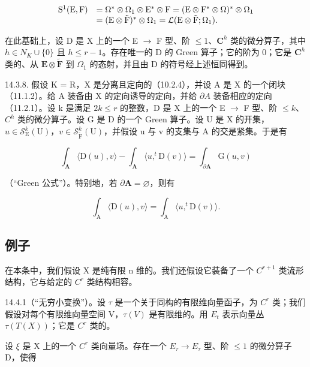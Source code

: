 \[
\begin{array}{r l} \mathrm{S} ^ {1} (\mathrm{E}, \mathrm{F}) & = \Omega^ {*} \otimes \Omega_ {1} \otimes \mathrm{E} ^ {*} \otimes \mathrm{F} = (\mathrm{E} \otimes \mathrm{F} ^ {*} \otimes \Omega) ^ {*} \otimes \Omega_ {1} \\ & = (\mathrm{E} \otimes \tilde {\mathrm{F}}) ^ {*} \otimes \Omega_ {1} = \mathcal {L} (\mathrm{E} \otimes \tilde {\mathrm{F}}; \Omega_ {1}). \end{array}
\]

在此基础上，设 D 是 X 上的一个 E \(\to\) F 型、阶 \(\leqslant1\)、\(\mathbf{C}^{h}\) 类的微分算子，其中 \(h \in N_{K} \cup \{0\}\) 且 \(h \leqslant r-1\)。存在唯一的 D 的 Green 算子；它的阶为 0；它是 \(\mathbf{C}^{h}\) 类的、从 \(\mathbf{E}\otimes\widetilde{\mathbf{F}}\) 到 \(\Omega_{1}\) 的态射，并且由 D 的符号经上述恒同得到。

14.3.8. 假设 K = R，X 是分离且定向的（10.2.4），并设 A 是 X 的一个闭块（11.1.2）。给 A 装备由 X 的定向诱导的定向，并给 \(\partial A\) 装备相应的定向（11.2.1）。设 k 是满足 \(2k \leqslant r\) 的整数，D 是 X 上的一个 E \(\to\) F 型、阶 \(\leqslant k\)、\(C^{h}\) 类的微分算子。设 G 是 D 的一个 Green 算子。设 U 是 X 的开集，\(u \in \mathcal{S}_{\mathrm{E}}^{k}(\mathrm{U})\)，\(v \in \mathcal{S}_{\widetilde{\mathrm{F}}}^{k}(\mathrm{U})\)，并假设 u 与 v 的支集与 A 的交是紧集。于是有

\[
\int_ {\mathbf {A}} \langle \mathrm{D} (u), v \rangle - \int_ {\mathbf {A}} \langle u, ^ {t} \mathrm{D} (v) \rangle = \int_ {\partial \mathbf {A}} \mathrm{G} (u, v)
\]

（“Green 公式”）。特别地，若 \(\partial\mathbf{A}=\varnothing\)，则有

\[
\int_ {\mathrm{A}} \langle \mathrm{D} (u), v \rangle = \int_ {\mathrm{A}} \langle u, ^ {t} \mathrm{D} (v) \rangle .
\]


\subsection{例子}

在本条中，我们假设 X 是纯有限 n 维的。我们还假设它装备了一个 \(C^{r+1}\) 类流形结构，它与给定的 \(C^{r}\) 类结构相容。

14.4.1（“无穷小变换”）。设 \(\tau\) 是一个关于同构的有限维向量函子，为 \(C^r\) 类；我们假设对每个有限维向量空间 V，\(\tau(V)\) 是有限维的。用 \(E_t\) 表示向量丛 \(\tau(T(X))\)；它是 \(C^r\) 类的。

设 \(\xi\) 是 X 上的一个 \(C^r\) 类向量场。存在一个 \(E_{\tau} \to E_{\tau}\) 型、阶 \(\leqslant1\) 的微分算子 D，使得

